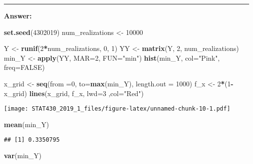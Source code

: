 \documentclass[]{article}
\newenvironment{Shaded}{\begin{snugshade}}{\end{snugshade}}
\newcommand{\KeywordTok}[1]{\textcolor[rgb]{0.13,0.29,0.53}{\textbf{#1}}}
\newcommand{\DataTypeTok}[1]{\textcolor[rgb]{0.13,0.29,0.53}{#1}}
\newcommand{\DecValTok}[1]{\textcolor[rgb]{0.00,0.00,0.81}{#1}}
\newcommand{\StringTok}[1]{\textcolor[rgb]{0.31,0.60,0.02}{#1}}
\newcommand{\OtherTok}[1]{\textcolor[rgb]{0.56,0.35,0.01}{#1}}
\newcommand{\OperatorTok}[1]{\textcolor[rgb]{0.81,0.36,0.00}{\textbf{#1}}}
\newcommand{\NormalTok}[1]{#1}
\begin{document}
\begin{center}\rule{0.5\linewidth}{\linethickness}\end{center}

\textbf{Answer:}

\begin{Shaded}
\begin{Highlighting}[]
\KeywordTok{set.seed}\NormalTok{(}\DecValTok{4302019}\NormalTok{)}
\NormalTok{num_realizations <-}\StringTok{ }\DecValTok{10000}


\NormalTok{Y <-}\StringTok{ }\KeywordTok{runif}\NormalTok{(}\DecValTok{2}\OperatorTok{*}\NormalTok{num_realizations, }\DecValTok{0}\NormalTok{, }\DecValTok{1}\NormalTok{)}
\NormalTok{YY <-}\StringTok{ }\KeywordTok{matrix}\NormalTok{(Y, }\DecValTok{2}\NormalTok{, num_realizations)}
\NormalTok{min_Y <-}\StringTok{ }\KeywordTok{apply}\NormalTok{(YY, }\DataTypeTok{MAR=}\DecValTok{2}\NormalTok{, }\DataTypeTok{FUN=}\StringTok{"min"}\NormalTok{)}
\KeywordTok{hist}\NormalTok{(min_Y, }\DataTypeTok{col=}\StringTok{"Pink"}\NormalTok{, }\DataTypeTok{freq=}\OtherTok{FALSE}\NormalTok{)}

\NormalTok{x_grid <-}\StringTok{ }\KeywordTok{seq}\NormalTok{(}\DataTypeTok{from =}\DecValTok{0}\NormalTok{, }\DataTypeTok{to=}\KeywordTok{max}\NormalTok{(min_Y), }\DataTypeTok{length.out =} \DecValTok{1000}\NormalTok{)}
\NormalTok{f_x <-}\StringTok{ }\DecValTok{2}\OperatorTok{*}\NormalTok{(}\DecValTok{1}\OperatorTok{-}\NormalTok{x_grid)}
\KeywordTok{lines}\NormalTok{(x_grid, f_x, }\DataTypeTok{lwd=}\DecValTok{3}\NormalTok{ ,}\DataTypeTok{col=}\StringTok{"Red"}\NormalTok{)}
\end{Highlighting}
\end{Shaded}

\texttt{[image: STAT430\_2019\_1\_files/figure-latex/unnamed-chunk-10-1.pdf]}

\begin{Shaded}
\begin{Highlighting}[]
\KeywordTok{mean}\NormalTok{(min_Y)}
\end{Highlighting}
\end{Shaded}

\begin{verbatim}
## [1] 0.3350795
\end{verbatim}

\begin{Shaded}
\begin{Highlighting}[]
\KeywordTok{var}\NormalTok{(min_Y)}
\end{Highlighting}
\end{Shaded}
\end{document}
